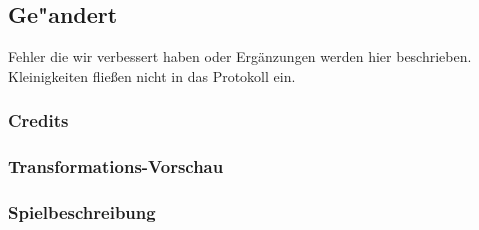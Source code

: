 %



\subsection{Ge{"a}ndert}
\label{Abschnitt:Aenderungen:Protokoll:Behobene_Probleme}

Fehler die wir verbessert haben oder Ergänzungen werden hier beschrieben. Kleinigkeiten fließen nicht in das Protokoll ein.\\





\subsubsection*{Credits}

\subsubsection*{Transformations-Vorschau}

\subsubsection*{Spielbeschreibung}










